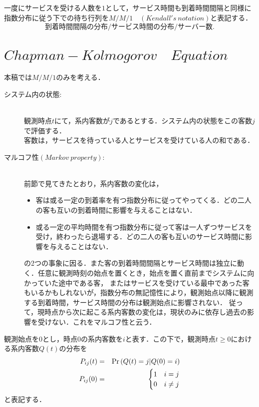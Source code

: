 \documentclass[a4j,papersize,disablejfam,slide,14pt]{jsarticle}
\def\cprob#1#2{\mbox{${\rm Pr} \left( #1 | #2 \right)$}} %
\begin{document}
    一度にサービスを受ける人数を$1$として，サービス時間も到着時間間隔と同様に指数分布に従う下での待ち行列を$M/M/1 \quad (Kendall's\ notation)$と表記する．\\
    \[
    	\mbox{到着時間間隔の分布} / \mbox{サービス時間の分布} / \mbox{サーバー数}.
    \]

\section{$Chapman-Kolmogorov\quad Equation$}
	本稿では$M/M/1$のみを考える．\\
    \begin{description}
		\item[システム内の状態:]\mbox{}\\
        	観測時点$t$にて，系内客数が$j$であるとする．システム内の状態をこの客数$j$で評価する．\\
            客数は，サービスを待っている人とサービスを受けている人の和である．\\
            \mbox{}
        \item[マルコフ性\　$(Markov\ property)$:]\mbox{}\\
    		前節で見てきたとおり，系内客数の変化は，
    		\begin{itemize}
    			\item 客は或る一定の到着率を有つ指数分布に従ってやってくる．どの二人の客も互いの到着時間に影響を与えることはない．
        		\item 或る一定の平均時間を有つ指数分布に従って客は一人ずつサービスを受け，終わったら退場する．どの二人の客も互いのサービス時間に影響を与えることはない．
    		\end{itemize}
    		の2つの事象に因る．また客の到着時間間隔とサービス時間は独立に動く．任意に観測時刻の始点を置くとき，始点を置く直前までシステムに向かっていた途中である客，
    		またはサービスを受けている最中であった客もいるかもしれないが，指数分布の無記憶性により，観測始点以降に観測する到着時間，サービス時間の分布は観測始点に影響されない．
    		従って，現時点から次に起こる系内客数の変化は，現状のみに依存し過去の影響を受けない．これをマルコフ性と云う．\\
            \mbox{}
    \end{description}
    観測始点を$0$とし，時点$0$の系内客数を$i$と表す．この下で，観測時点$t \geq 0$における系内客数$Q(t)$の分布を
    \begin{eqnarray}
    	P_{ij}(t) &=& \cprob{Q(t) = j}{Q(0) = i} \\
        P_{ij}(0) &=& 
        \begin{cases}
        	1 & \text{$i = j$} \\
            0 & \text{$i \neq j$}
        \end{cases}
    \end{eqnarray}
    と表記する．
\end{document}
